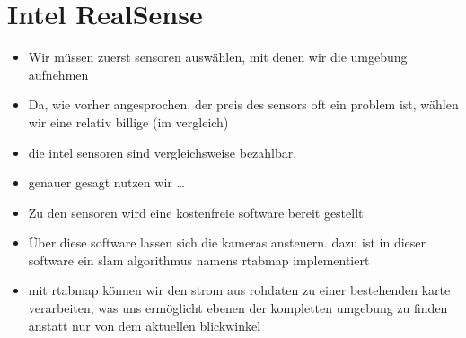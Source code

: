\documentclass[main.tex]{subfiles}
\begin{document}
\section{Intel RealSense}
\begin{itemize}
    \item Wir müssen zuerst sensoren auswählen, mit denen wir die umgebung aufnehmen
    \item Da, wie vorher angesprochen, der preis des sensors oft ein problem ist, wählen wir eine relativ billige (im vergleich)
    \item die intel sensoren sind vergleichsweise bezahlbar. 
    \item genauer gesagt nutzen wir \dots{}
    \item Zu den sensoren wird eine kostenfreie software bereit gestellt
    \item Über diese software lassen sich die kameras ansteuern. dazu ist in dieser software ein slam algorithmus namens rtabmap implementiert
    \item mit rtabmap können wir den strom aus rohdaten zu einer bestehenden karte verarbeiten, was uns ermöglicht ebenen der kompletten umgebung zu finden anstatt nur von dem aktuellen blickwinkel
\end{itemize}




\end{document}

